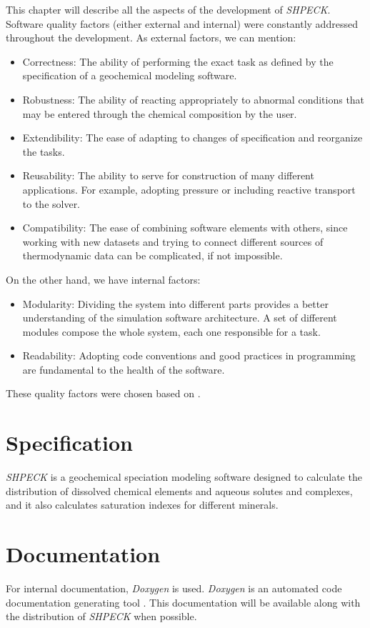 This chapter will describe all the aspects of the development of \emph{SHPECK}. Software quality factors (either external and internal) were constantly addressed throughout the development. As external factors, we can mention:
\begin{itemize}
\item Correctness: The ability of performing the exact task as defined by the specification of a geochemical modeling software.
\item Robustness: The ability of reacting appropriately to abnormal conditions that may be entered through the chemical composition by the user.
\item Extendibility: The ease of adapting to changes of specification and reorganize the tasks.
\item Reusability: The ability to serve for construction of many different applications. For example, adopting  pressure or including reactive transport to the solver.
\item Compatibility: The ease of combining software elements with others, since working with new datasets and trying to connect different sources of thermodynamic data can be complicated, if not impossible.
\end{itemize}
On the other hand, we have internal factors:
\begin{itemize}
\item Modularity: Dividing the system into different parts provides a better understanding of the simulation software architecture. A set of different modules compose the whole system, each one responsible for a task.
\item Readability: Adopting code conventions and good practices in programming are fundamental to the health of the software.
\end{itemize}
These quality factors were chosen based on \cite{Meyer:00}.

\section{Specification}
\emph{SHPECK} is a geochemical speciation modeling software designed to calculate the distribution of dissolved chemical elements and aqueous solutes and complexes, and it also calculates saturation indexes for different minerals. 

\section{Documentation}
For internal documentation, \emph{Doxygen} is used. \emph{Doxygen} is an automated code documentation generating tool \cite{Heesch:13}. This documentation will be available along with the distribution of \emph{SHPECK} when possible.

